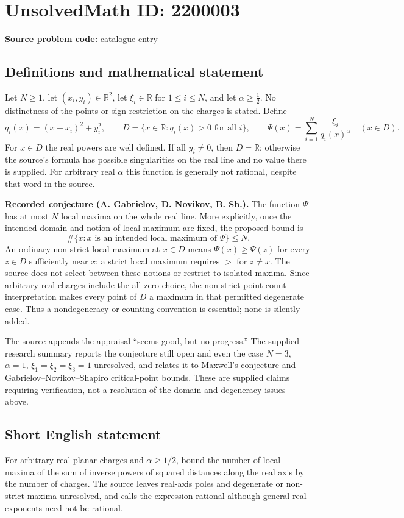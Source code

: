 \documentclass[11pt]{article}
\newcommand{\R}{\mathbb{R}}
\begin{document}
\section*{UnsolvedMath ID: 2200003}
\textbf{Source problem code:} catalogue entry
\subsection{Definitions and mathematical statement}
Let $N\geq1$, let $(x_i,y_i)\in\R^2$, let $\xi_i\in\R$ for $1\leq i\leq N$, and let $\alpha\geq\tfrac12$. No distinctness of the points or sign restriction on the charges is stated. Define
\[
 q_i(x)=(x-x_i)^2+y_i^2,\qquad
 D=\{x\in\R:q_i(x)>0\text{ for all }i\},\qquad
 \Psi(x)=\sum_{i=1}^{N}\frac{\xi_i}{q_i(x)^\alpha}\quad(x\in D).
\]
For $x\in D$ the real powers are well defined. If all $y_i\ne0$, then $D=\R$; otherwise the source's formula has possible singularities on the real line and no value there is supplied. For arbitrary real $\alpha$ this function is generally not rational, despite that word in the source.

\textbf{Recorded conjecture (A. Gabrielov, D. Novikov, B. Sh.).} The function $\Psi$ has at most $N$ local maxima on the whole real line. More explicitly, once the intended domain and notion of local maximum are fixed, the proposed bound is
\[
 \#\{x:x\text{ is an intended local maximum of }\Psi\}\leq N.
\]
An ordinary non-strict local maximum at $x\in D$ means $\Psi(x)\geq\Psi(z)$ for every $z\in D$ sufficiently near $x$; a strict local maximum requires $>$ for $z\ne x$. The source does not select between these notions or restrict to isolated maxima. Since arbitrary real charges include the all-zero choice, the non-strict point-count interpretation makes every point of $D$ a maximum in that permitted degenerate case. Thus a nondegeneracy or counting convention is essential; none is silently added.

The source appends the appraisal ``seems good, but no progress.'' The supplied research summary reports the conjecture still open and even the case $N=3$, $\alpha=1$, $\xi_1=\xi_2=\xi_3=1$ unresolved, and relates it to Maxwell's conjecture and Gabrielov--Novikov--Shapiro critical-point bounds. These are supplied claims requiring verification, not a resolution of the domain and degeneracy issues above.
\subsection{Short English statement}
For arbitrary real planar charges and $\alpha\geq1/2$, bound the number of local maxima of the sum of inverse powers of squared distances along the real axis by the number of charges. The source leaves real-axis poles and degenerate or non-strict maxima unresolved, and calls the expression rational although general real exponents need not be rational.
\end{document}
